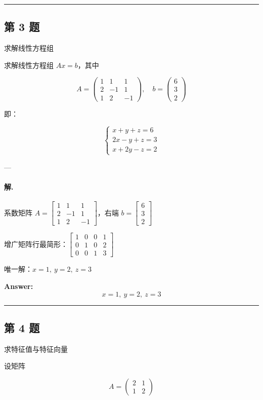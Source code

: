 \documentclass[12pt, a4paper]{ctexart}
\newcommand{\problem}[1]{\subsection*{第 #1 题}}
\newcommand{\solution}{\paragraph{解.}}
\begin{document}
\vspace{1em}
\hrule
\vspace{1em}

\problem{3}

求解线性方程组

求解线性方程组 $Ax = b$，其中

$$
A = \begin{pmatrix} 1 & 1 & 1 \\ 2 & -1 & 1 \\ 1 & 2 & -1 \end{pmatrix}, \quad
b = \begin{pmatrix} 6 \\ 3 \\ 2 \end{pmatrix}
$$

即：

$$
\begin{cases} x + y + z = 6 \\ 2x - y + z = 3 \\ x + 2y - z = 2 \end{cases}
$$

---

\solution

系数矩阵 $A = \begin{bmatrix}1 & 1 & 1 \\ 2 & -1 & 1 \\ 1 & 2 & -1\end{bmatrix}$，右端 $b = \begin{bmatrix}6 \\ 3 \\ 2\end{bmatrix}$

增广矩阵行最简形：$\left[\begin{matrix}1 & 0 & 0 & 1\\0 & 1 & 0 & 2\\0 & 0 & 1 & 3\end{matrix}\right]$

唯一解：$x = 1,\ y = 2,\ z = 3$

\textbf{Answer:}
\[\boxed{x = 1,\ y = 2,\ z = 3}\]

\vspace{1em}
\hrule
\vspace{1em}

\problem{4}

求特征值与特征向量

设矩阵

$$
A = \begin{pmatrix} 2 & 1 \\ 1 & 2 \end{pmatrix}
$$
\end{document}
